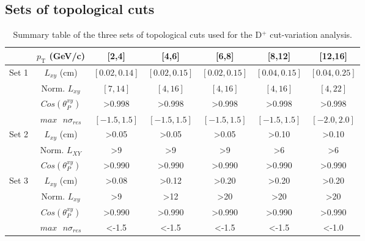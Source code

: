\documentclass[b5paper,10pt,twoside,oldstyle,classica]{toptesi}
\newcommand{\pt}{p_\text{T}}
\begin{document}
\subsection{Sets of topological cuts}
\label{cutvar_cuts_sec}
\begin{table}[b]
\centering 
\begin{center} %
\renewcommand\arraystretch{1.5} 
\fontsize{8}{8.5}\selectfont
\begin{tabular}{|c|c|c|c|c|c|c|}
\cline{2-7}
\multicolumn{1}{c|}{} & $\pt$ (GeV/c) & [2,4] & [4,6] & [6,8] & [8,12] & [12,16] \\
\hline
\multirow{4}{*}{Set 1}& $L_{xy}$ (cm)& $[0.02,0.14]$ & $[0.02,0.15]$ & $[0.02,0.15]$ & $[0.04,0.15]$ & $[0.04,0.25]$ \\
& Norm. $L_{xy}$ & $[7,14]$ & $[4,16]$ & $[4,16]$ & $[4,16]$ & $[4,22]$ \\
& $Cos(\theta_P^{xy})$ & >0.998 & >0.998 & >0.998 & >0.998 & >0.998 \\
& $max\text{ }n\sigma_{res}$ & $[-1.5,1.5]$ & $[-1.5,1.5]$ & $[-1.5,1.5]$ & $[-1.5,1.5]$ & $[-2.0,2.0]$\\
\hline
\multirow{3}{*}{Set 2}& $L_{xy}$ (cm)& >0.05 & >0.05 & >0.05 & >0.10 & >0.10 \\
& Norm. $L_{XY}$ & >9 & >9 & >9 & >6 & >6 \\
& $Cos(\theta_P^{xy})$ & >0.990 & >0.990 & >0.990 & >0.990 & >0.990 \\
\hline
\multirow{4}{*}{Set 3}& $L_{xy}$ (cm)& >0.08 & >0.12 & >0.20 & >0.20 & >0.20 \\
& Norm. $L_{xy}$ & >9 & >12 & >20 & >20 & >20 \\
& $Cos(\theta_P^{xy})$ & >0.990 & >0.990 & >0.990 & >0.990 & >0.990 \\
& $max\text{ }n\sigma_{res}$ & <-1.5 & <-1.5 & <-1.5 & <-1.5 & <-1.0\\
\hline
\end{tabular}
\caption{Summary table of the three sets of topological cuts used for the D$^+$ cut-variation analysis.}
\label{cutvar_cuts}
\end{center} 
\end{table}
\end{document}
